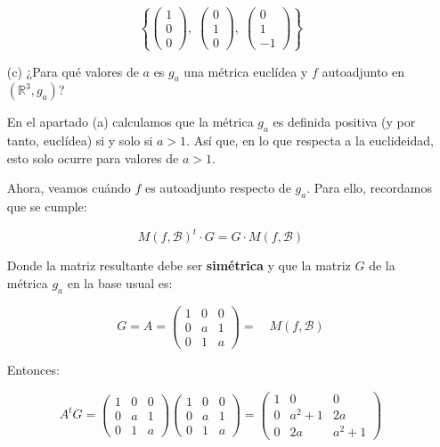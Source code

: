 \documentclass[12pt]{article}
\begin{document}
\begin{ejercicio}[4 puntos]
\begin{enumerate}
			\[
			\left\lbrace
			\begin{pmatrix} 1 \\ 0 \\ 0 \end{pmatrix},\;
			\begin{pmatrix} 0 \\ 1 \\ 0 \end{pmatrix},\;
			\begin{pmatrix} 0 \\ 1 \\ -1 \end{pmatrix}
			\right\rbrace
			\]
			
			\item[(c)] ¿Para qué valores de $a$ es $g_a$ una métrica euclídea y $f$ autoadjunto en $(\mathbb{R}^3, g_a)$?
			
			En el apartado (a) calculamos que la métrica \( g_a \) es definida positiva (y por tanto, euclídea) si y solo si \( a > 1 \). Así que, en lo que respecta a la euclideidad, esto solo ocurre para valores de \( a > 1 \).
			
			Ahora, veamos cuándo \( f \) es autoadjunto respecto de \( g_a \). Para ello, recordamos que se cumple:
			
			\[
			M(f, \mathcal{B})^t \cdot G = G \cdot M(f, \mathcal{B})
			\]
			
			Donde la matriz resultante debe ser \textbf{simétrica} y que la matriz \( G \) de la métrica \( g_a \) en la base usual es:
			
			\[
			G = A = 
			\begin{pmatrix}
				1 & 0 & 0 \\
				0 & a & 1 \\
				0 & 1 & a
			\end{pmatrix} =\quad M(f, \mathcal{B})
			\]
			
			Entonces:
			
			\[
			A^t G = 
			\begin{pmatrix}
				1 & 0 & 0 \\
				0 & a & 1 \\
				0 & 1 & a
			\end{pmatrix}
			\begin{pmatrix}
				1 & 0 & 0 \\
				0 & a & 1 \\
				0 & 1 & a
			\end{pmatrix}
			=
			\begin{pmatrix}
				1 & 0 & 0 \\
				0 & a^2 + 1 & 2a \\
				0 & 2a & a^2 + 1
			\end{pmatrix}
			\]
			

\end{enumerate}
\end{ejercicio}
\end{document}
